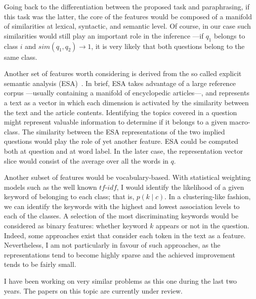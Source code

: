 \documentclass[11pt]{article}
\begin{document}
Going back to the differentiation between the proposed task and paraphrasing, 
if this task was the latter, the core of the features would be composed of a 
manifold of similarities at lexical, syntactic, and semantic level. Of course, 
in our case such similarities would still play an important role in the 
inference ---if $q_1$ belongs to class $i$ and $sim(q_1,q_2)\rightarrow 1$, it 
is very likely that both questions belong to the same class. 

Another set of features worth considering is derived from the so called explicit 
semantic analysis (ESA)~\cite{Gabrilovich:07}. In brief, ESA takes advantage of 
a large reference corpus ---usually containing a manifold of encyclopedic 
articles---, and represents a text as a vector in which each dimension is 
activated by the similarity between the text and the article contents. 
Identifying the topics covered in a question might represent valuable 
information to determine if it belongs to a given macro-class. The similarity 
between the ESA representations of the two implied questions would play the role 
of yet another feature. ESA could be computed both at question and at word 
label. In the later case, the representation vector slice would consist of the 
average over all the words in $q$.

Another subset of features would be vocabulary-based. With statistical weighting 
models such as the well known $tf$-$idf$, I would identify the likelihood of a 
given keyword of belonging to each class; that is, $p(k\mid c)$. In a 
clustering-like fashion, we can identify the keywords with the highest and 
lowest association levels to each of the classes. A selection of the most 
discriminating keywords would be considered as binary features: whether keyword 
$k$ appears or not in the question. Indeed, some approaches exist that consider 
each token in the text as a feature. Nevertheless, I am not particularly in 
favour of such approaches, as the representations tend to become highly sparse 
and the achieved improvement tends to be fairly small.
\medskip

I have been working on very similar problems as this one during the last two 
years. The papers on this topic are currently under review.

\end{document}
